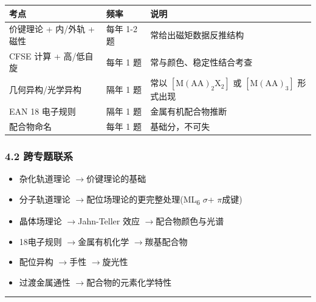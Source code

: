 \documentclass[a4paper,11pt]{ctexart}
\providecommand{\tightlist}{\setlength{\itemsep}{0pt}\setlength{\parskip}{0pt}}
\newcounter{none}
\newcommand{\箭}{\ensuremath{\rightarrow}}
\newcommand{\左箭}{\ensuremath{\leftarrow}}
\newcommand{\上箭}{\ensuremath{\uparrow}}
\newcommand{\下箭}{\ensuremath{\downarrow}}
\newcommand{\衡}{\ensuremath{\rightleftharpoons}}
\newcommand{\双箭}{\ensuremath{\leftrightarrow}}
\newcommand{\约等于}{\ensuremath{\approx}}
\newcommand{\小于等于}{\ensuremath{\leq}}
\newcommand{\大于等于}{\ensuremath{\geq}}
\newcommand{\不等于}{\ensuremath{\neq}}
\newcommand{\西格马}{\ensuremath{\sigma}}
\newcommand{\派}{\ensuremath{\pi}}
\begin{document}
{\def\LTcaptype{none} %
\begin{longtable}[]{@{}
  >{\raggedright\arraybackslash}p{}
  >{\centering\arraybackslash}p{}
  >{\raggedright\arraybackslash}p{}@{}}
\toprule\noalign{}
\begin{minipage}[b]{\linewidth}\raggedright
考点
\end{minipage} & \begin{minipage}[b]{\linewidth}\centering
频率
\end{minipage} & \begin{minipage}[b]{\linewidth}\raggedright
说明
\end{minipage} \\
\midrule\noalign{}
\endhead
\bottomrule\noalign{}
\endlastfoot
价键理论 + 内/外轨 + 磁性 & 每年 1-2 题 & 常给出磁矩数据反推结构 \\
CFSE 计算 + 高/低自旋 & 每年 1 题 & 常与颜色、稳定性结合考查 \\
几何异构/光学异构 & 隔年 1 题 & 常以 \([\mathrm{M(AA)_2X_2}]\) 或 \([\mathrm{M(AA)_3}]\) 形式出现 \\
EAN 18 电子规则 & 隔年 1 题 & 金属有机配合物推断 \\
配合物命名 & 每年 1 题 & 基础分，不可失 \\
\end{longtable}
}

\subsubsection{4.2 跨专题联系}\label{ux8de8ux4e13ux9898ux8054ux7cfb}

\begin{itemize}
\tightlist
\item
  杂化轨道理论 \箭 价键理论的基础
\item
  分子轨道理论 \箭 配位场理论的更完整处理(ML\textsubscript{6} \西格马 + \派 成键)
\item
  晶体场理论 \箭 Jahn-Teller 效应 \箭 配合物颜色与光谱
\item
  18电子规则 \箭 金属有机化学 \箭 羰基配合物
\item
  配位异构 \箭 手性 \箭 旋光性
\item
  过渡金属通性 \箭 配合物的元素化学特性
\end{itemize}

\begin{center}\rule{0.5\linewidth}{0.5pt}\end{center}
\end{document}
